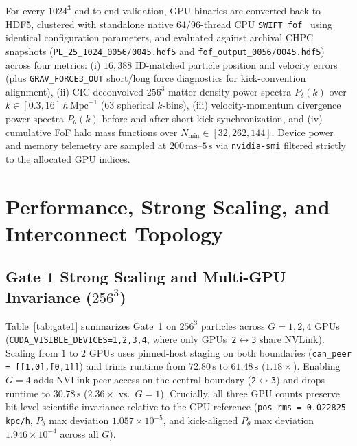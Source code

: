 \documentclass[aps,prd,reprint,superscriptaddress,nofootinbib,amsmath,amssymb,floatfix,longbibliography]{revtex4-2}
\begin{document}
For every $1024^3$ end-to-end validation, GPU binaries are converted back to HDF5, clustered with standalone native 64/96-thread CPU \texttt{SWIFT fof}~\citep{Davis1985FOF} using identical configuration parameters, and evaluated against archival CHPC snapshots (\texttt{PL\_25\_1024\_0056/0045.hdf5} and \texttt{fof\_output\_0056/0045.hdf5}) across four metrics: (i) $16{,}388$ ID-matched particle position and velocity errors (plus \texttt{GRAV\_FORCE3\_OUT} short/long force diagnostics for kick-convention alignment), (ii) CIC-deconvolved $256^3$ matter density power spectra $P_\delta(k)$ over $k \in [0.3, 16]\,h\,\mathrm{Mpc}^{-1}$ ($63$ spherical $k$-bins), (iii) velocity-momentum divergence power spectra $P_\theta(k)$ before and after short-kick synchronization, and (iv) cumulative FoF halo mass functions over $N_{\min} \in [32, 262{,}144]$. Device power and memory telemetry are sampled at $200\,\mathrm{ms}$--$5\,\mathrm{s}$ via \texttt{nvidia-smi} filtered strictly to the allocated GPU indices.

\section{Performance, Strong Scaling, and Interconnect Topology}\label{sec:perf}

\subsection{Gate 1 Strong Scaling and Multi-GPU Invariance (\texorpdfstring{$256^3$}{256 cubed})}

Table~\ref{tab:gate1} summarizes Gate~1 on $256^3$ particles across $G = 1, 2, 4$ GPUs (\texttt{CUDA\_VISIBLE\_DEVICES=1,2,3,4}, where only GPUs~\texttt{2$\leftrightarrow$3} share NVLink). Scaling from $1$ to $2$ GPUs uses pinned-host staging on both boundaries (\texttt{can\_peer = [[1,0],[0,1]]}) and trims runtime from $72.80\,\mathrm{s}$ to $61.48\,\mathrm{s}$ ($1.18\times$). Enabling $G = 4$ adds NVLink peer access on the central boundary (\texttt{2$\leftrightarrow$3}) and drops runtime to $30.78\,\mathrm{s}$ ($2.36\times$ vs.\ $G=1$). Crucially, all three GPU counts preserve bit-level scientific invariance relative to the CPU reference (\texttt{pos\_rms = 0.022825 kpc/h}, $P_\delta$ max deviation $1.057 \times 10^{-5}$, and kick-aligned $P_\theta$ max deviation $1.946 \times 10^{-4}$ across all $G$).
\end{document}
